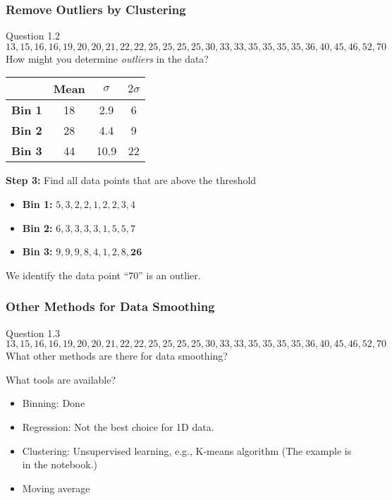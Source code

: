 \documentclass[aspectratio=169, 10pt]{beamer}
\begin{document}
\begin{frame}[t]
    \frametitle{Remove Outliers by Clustering}

    \begin{block}{Question 1.2}
        \[13,15,16,16,19,20,20,21,22,22,25,25,25,25,30,33,33,35,35,35,35,36,40,45,46,52,70\]
        How might you determine \textit{outliers} in the data?
    \end{block}

    \begin{table}[]
        \begin{tabular}{l|ccc}
              & Mean & $\sigma$  & $2\sigma$ \\
              \hline
              \textbf{Bin 1} & 18   & 2.9  & 6          \\
              \textbf{Bin 2} & 28   & 4.4  & 9          \\
              \textbf{Bin 3} & 44   & 10.9 & 22        
        \end{tabular}
    \end{table}

    \textbf{Step 3:} Find all data points that are above the threshold
    \begin{itemize}
        \item \textbf{Bin 1:} $5, 3, 2, 2, 1, 2, 2, 3, 4$
        \item \textbf{Bin 2:} $6, 3, 3, 3, 3, 1, 5, 5, 7$
        \item \textbf{Bin 3:} $ 9,  9,  9,  8,  4,  1,  2,  8, \textbf{26}$
    \end{itemize}

    We identify the data point ``70'' is an outlier.
\end{frame}

\begin{frame}[t]
    \frametitle{Other Methods for Data Smoothing}

    \begin{block}{Question 1.3}
        \[13,15,16,16,19,20,20,21,22,22,25,25,25,25,30,33,33,35,35,35,35,36,40,45,46,52,70\]
        What other methods are there for data smoothing?
    \end{block}

    What tools are available?
    \begin{itemize}
        \item Binning: Done
        \item Regression: Not the best choice for 1D data.
        \item Clustering: Unsupervised learning, e.g., K-means algorithm (The example is in the notebook.)
        \item Moving average
    \end{itemize}

\end{frame}
\end{document}
